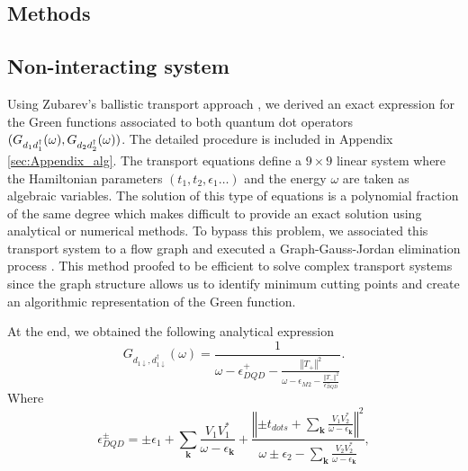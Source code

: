 \documentclass[showpacs,aps,prb,reprint,superscriptaddress]{revtex4-1}
\begin{document}
\subsection{Methods }

\subsection{Non-interacting system \label{sec:non-interactingMethods}}

Using Zubarev's ballistic transport approach \cite{zubarev_double-time_1960}, we derived an exact expression for the Green functions associated to both quantum dot operators $(G_{d_1d^\dagger_1}(\omega),G_{d_2d^\dagger_2}(\omega))$.  The detailed procedure is included in Appendix \ref{sec:Appendix_alg}. The transport equations define a $9 \times 9$ linear system where the Hamiltonian parameters $(t_1,t_2,\epsilon_1 \ldots)$ and the energy $\omega$ are taken as algebraic variables. The solution of this type of equations is a polynomial fraction of the same degree which makes difficult to provide an exact solution using analytical or numerical methods. To bypass this problem, we associated this transport system to a flow graph and executed a Graph-Gauss-Jordan elimination process \cite{spielman_algorithms_2010}.  This method proofed to be efficient to solve complex transport systems since the graph structure allows us to identify minimum cutting points  and create an algorithmic representation of the Green function. 


At the end, we obtained the following analytical expression
\begin{equation}
    G_{{d_{1\downarrow},d_{1\downarrow}^{\dagger}}}\left(\omega\right)=\frac{1}{\omega-\epsilon_{DQD}^{+}-\frac{\left\Vert T_{+}\right\Vert ^{2}}{\omega-\epsilon_{M2}-\frac{\left\Vert T_{-}\right\Vert ^{2}}{\epsilon_{DQD}^{-}}}}.
    \label{eq:Green_NonInteracting}
\end{equation}
\noindent Where
\begin{equation}
    \epsilon_{DQD}^{\pm}=\pm\epsilon_{1}+\sum_{\mathbf{k}}\frac{V_{1}V_{1}^{*}}{\omega-\epsilon_{\mathbf{k}}}+\frac{\left\Vert \pm t_{dots}+\sum_{\mathbf{k}}\frac{V_{1}V_{2}^{*}}{\omega-\epsilon_{\mathbf{k}}}\right\Vert ^{2}}{\omega\pm\epsilon_{2}-\sum_{\mathbf{k}}\frac{V_{2}V_{2}^{*}}{\omega-\epsilon_{\mathbf{k}}}}, \label{eq:epDQD}
\end{equation}
\noindent 
\end{document}
